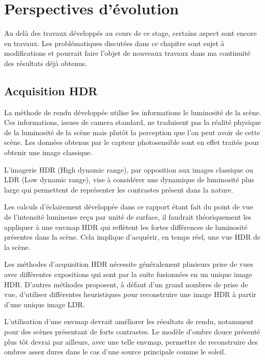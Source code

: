 \documentclass[10pt,a4paper,twoside, twocolumn]{report}
\begin{document}
\iftwocolumn \twocolumn \else \onecolumn \fi


\chapter{Perspectives d’évolution}

Au delà des travaux développés au cours de ce stage, certains aspect sont encore en travaux. Les problématiques discutées dans ce chapitre sont sujet à modifications et pourrait faire l’objet de nouveaux travaux dans ma continuité des résultats déjà obtenus.


\section{Acquisition HDR}

La méthode de rendu développée utilise les informations le luminosité de la scène. Ces informations, issues de camera standard, ne traduisent pas la réalité physique de la luminosité de la scène mais plutôt la perception que l’on peut avoir de cette scène. Les données obtenus par le capteur photosensible sont en effet traités pour obtenir une image classique.

L’imagerie HDR (High dynamic range), par opposition aux images classique ou LDR (Low dynamic range), vise à considérer une dynamique de luminosité plus large qui permettent de représenter les contrastes présent dans la nature. 

Les calculs d’éclairement développée dans ce rapport étant fait du point de vue de l’intensité lumineuse reçu par unité de surface, il faudrait théoriquement les appliquer à une envmap HDR qui reflètent les fortes différences de luminosité présentes dans la scène. Cela implique d’acquérir, en temps réel, une vue HDR de la scène. 

Les méthodes d’acquisition HDR nécessite généralement plusieurs prise de vues avec différentes expositions qui sont par la suite fusionnées en un unique image HDR. D’autres méthodes proposent, à défaut d’un grand nombres de prise de vue, d’utiliser différentes heuristiques pour reconstruire une image HDR à partir d’une unique image LDR\cite{Rempel2006}.

L’utilisation d’une envmap devrait améliorer les résultats de rendu, notamment pour des scènes présentant de forts contrastes. Le modèle d’ombre douce présenté plus tôt devrai par ailleurs, avec une telle envmap, permettre de reconstruire des ombres assez dures dans le cas d’une source principale comme le soleil.
\end{document}
